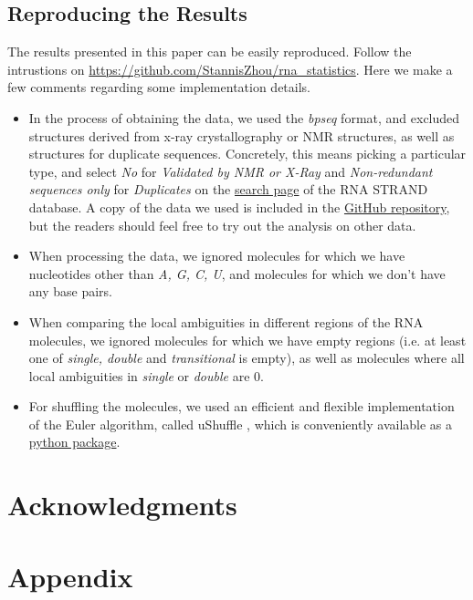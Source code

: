 \documentclass[10pt,letterpaper]{article}
\begin{document}
\subsection*{Reproducing the Results}
The results presented in this paper can be easily reproduced. Follow the intrustions on \url{https://github.com/StannisZhou/rna_statistics}. Here we make a few comments regarding some implementation details.
\begin{itemize}
	\item In the process of obtaining the data, we used the \textit{bpseq} format, and excluded structures derived from x-ray crystallography or NMR structures, as well as structures for duplicate sequences. Concretely, this means picking a particular type, and select \textit{No} for \textit{Validated by NMR or X-Ray} and \textit{Non-redundant sequences only} for \textit{Duplicates} on the \href{http://www.rnasoft.ca/strand/search.php}{search page} of the RNA STRAND database. A copy of the data we used is included in the \href{https://github.com/StannisZhou/rna_statistics/tree/master/data}{GitHub repository}, but the readers should feel free to try out the analysis on other data.
	\item When processing the data, we ignored molecules for which we have nucleotides other than \textit{A, G, C, U}, and molecules for which we don't have any base pairs.
	\item When comparing the local ambiguities in different regions of the RNA molecules, we ignored molecules for which we have empty regions (i.e. at least one of \textit{single, double} and \textit{transitional} is empty), as well as molecules where all local ambiguities in \textit{single} or \textit{double} are 0.
	\item For shuffling the molecules, we used an efficient and flexible implementation of the Euler algorithm\cite{Kandel1996-kz, Fitch1983-ec, Altschul1985-nq}, called uShuffle \cite{Jiang2008-yj}, which is conveniently available as a \href{https://github.com/guma44/ushuffle}{python package}.
\end{itemize}

\section*{Acknowledgments}

\section*{Appendix}

\nolinenumbers


\end{document}
